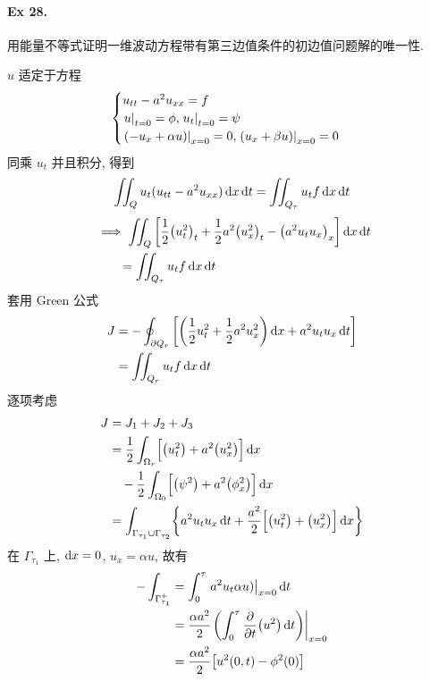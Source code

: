 \paragraph{Ex 28.}
用能量不等式证明一维波动方程带有第三边值条件的初边值问题解的唯一性.

\begin{solution}
$u$ 适定于方程
\[ \begin{cases}
u_{tt} - a^2 u_{xx} = f \\
{\left.{u} \right|}_{t=0} = \phi, {\left.{u_t} \right|}_{t=0} = \psi \\
{\left.{{\left( {-u_x + \alpha u} \right)}} \right|}_{x=0} = 0,
{\left.{{\left( {u_x + \beta u} \right)}} \right|}_{x=0} = 0
\end{cases} \]
同乘 $u_t$ 并且积分, 得到
\[
\iint_Q u_t (u_{tt} - a^2 u_{xx}) \operatorname{d\!} x \operatorname{d\!} t
= \iint_{Q_\tau} u_t f \operatorname{d\!} x \operatorname{d\!} t
\]
\begin{align*}
&\implies\iint_Q {\left[ {\frac12 \bigl( u_t^2 \bigr)_t
    + \frac12 a^2 \bigl( u_x^2 \bigr)_t
    - \bigl( a^2 u_t u_x \bigr)_x } \right]} \operatorname{d\!} x \operatorname{d\!} t \\
&\quad\quad= \iint_{Q_\tau} u_t f \operatorname{d\!} x \operatorname{d\!} t
\end{align*}
套用 Green 公式
\begin{align*}
J &= -\oint_{\partial Q_r} {\left[ {
    {\left( {\frac12 u_t^2 + \frac12 a^2 u_x^2} \right)} \operatorname{d\!} x
    + a^2 u_t u_x \operatorname{d\!} t
} \right]} \\
&= \iint_{Q_r} u_t f \operatorname{d\!} x \operatorname{d\!} t
\end{align*}
逐项考虑
\begin{align*}
J &= J_1 + J_2 + J_3 \\
&= \frac12 \int_{\Omega_r} \Bigl[
    \bigl( u_t^2 \bigr) + a^2 \bigl( u_x^2 \bigr)
    \Bigr] \operatorname{d\!} x \\
&\quad- \frac12 \int_{\Omega_0} \Bigl[
    \bigl( \psi^2 \bigr) + a^2 \bigl( \phi_x^2 \bigr)
    \Bigr] \operatorname{d\!} x \\
&= \int_{\Gamma_{\tau_1} \cup \Gamma_{\tau_2}} \biggl\{
    a^2 u_t u_x \operatorname{d\!} t + \frac{a^2}{2} \Bigl[
    \bigl( u_t^2 \bigr) + \bigl( u_x^2 \bigr)
    \Bigr] \operatorname{d\!} x \biggr\}
\end{align*}
在 $\Gamma_{\tau_1}$ 上, $\operatorname{d\!} x = 0$, $u_x = \alpha u$, 故有
\begin{align*}
-\int_{\Gamma_{\tau_1}^+} &=
    \int_0^{\tau} \mfwhen{a^2u_t\alpha u)}{x=0} \diff t \\
&= \frac{\alpha a^2}{2} \mfwhen{
    \mclosure{\int_0^\tau \fracpartials{t} \mclosure{u^2} \diff t}
    }{x=0} \\
&= \frac{\alpha a^2}{2} \mclosuresquare{u^2(0, t) - \phi^2(0)}

\end{align*}
\end{solution}
